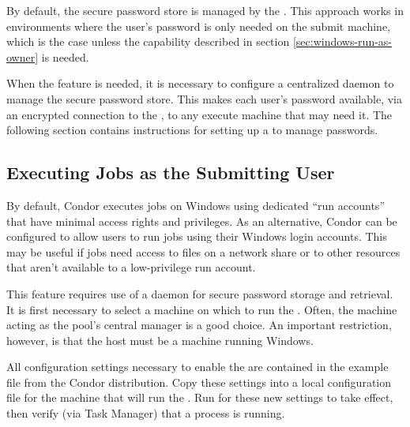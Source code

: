 By default, the secure password store is managed by the
.  This approach works in environments where
the user's password is only needed on the submit machine, which
is the case unless the  capability described
in section \ref{sec:windows-run-as-owner} is needed.

When the  feature is needed, it is necessary
to configure a centralized  daemon to manage the secure
password store.  This makes each user's password available, via an encrypted
connection to the , to any execute machine that may
need it. The following section contains instructions for setting up
a  to manage passwords.

\subsection{\label{sec:windows-run-as-owner}Executing Jobs as the Submitting User}

By default, Condor executes jobs on Windows using dedicated ``run
accounts'' that have minimal access rights and privileges.  As an
alternative, Condor can be configured to allow users to run jobs using
their Windows login accounts. This may be useful if jobs
need access to files on a network share or to other resources that aren't
available to a low-privilege run account.

This feature requires use of a  daemon for secure
password storage and retrieval. It is first necessary to select
a machine on which to run the . Often, the machine
acting as the pool's central manager is a good choice. An important
restriction, however, is that the  host must be a
machine running Windows.

All configuration settings necessary to enable the  are
contained in the example 
file from the Condor distribution. Copy these settings into a local
configuration file for the machine that will run the .
Run  for these new settings to take effect, then
verify (via Task Manager) that a  process is running.

